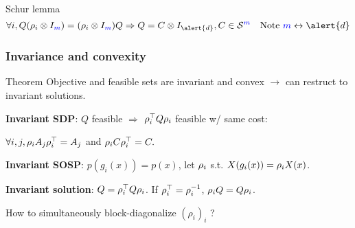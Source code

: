 \begin{frame}{Schur lemma}
  $$\forall i, Q (\induced_i \otimes I_{\textcolor{blue}{m}}) = (\induced_i \otimes I_{\textcolor{blue}{m}}) Q \Rightarrow Q = C \otimes I_{\alert{d}}, C \in \SymK[{\textcolor{blue}{m}}] \quad \text{Note }{\textcolor{blue}{m}} \leftrightarrow \alert{d}$$

\end{frame}

\begin{frame}[fragile]
  \frametitle{Invariance and convexity}
  \begin{block}{Theorem}
    Objective and feasible sets are \alert{invariant} and \alert{convex}
    $\to$
    can restruct to invariant solutions.
  \end{block}

    \textbf{Invariant SDP}:
    $Q$ feasible $\Rightarrow$ $\rho_i^\top Q \rho_i$ feasible w/ same cost:

    $\forall i, j, \rho_i A_j \rho_i^\top = A_j$ and $\rho_i C \rho_i^\top = C.$

    \textbf{Invariant SOSP}:
    $p(g_i(x)) = p(x)$, let $\rho_i$ s.t. $X(g_i(x)) = \rho_i X(x)$.

    \textbf{Invariant solution}:
    $Q = \rho_i^\top Q \rho_i$. If $\rho_i^\top = \rho_i^{-1}$, $\rho_i Q = Q \rho_i$.

  \begin{center}
    How to \alert{simultaneously} block-diagonalize $(\rho_i)_i$ ?
  \end{center}
\end{frame}
